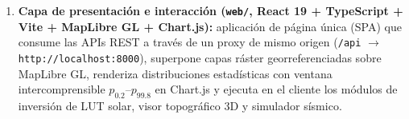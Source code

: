 \documentclass[11pt,a4paper]{article}
\newcommand{\src}[1]{\nolinkurl{#1}}
\begin{document}
\begin{enumerate}
        verificados contra catálogo y las series numéricas de inspección (\texttt{jsonb}) residen en PostGIS
        dentro de un contenedor Docker con volumen persistente (\texttt{pgdata}). Los productos ráster pesados
        (GeoTIFF/COG de $32\,\text{bits}$ y PNG de visualización) se almacenan en jerarquías de disco inmutables
        por hash (, , , 
        y ).
  \item \textbf{Capa de presentación e interacción (\src{web/}, React 19 + TypeScript + Vite + MapLibre GL + Chart.js):}
        aplicación de página única (SPA) que consume las APIs REST a través de un proxy de mismo origen
        (\texttt{/api} $\to$ \texttt{http://localhost:8000}), superpone capas ráster georreferenciadas sobre
        MapLibre GL, renderiza distribuciones estadísticas con ventana intercomprensible $p_{0.2}\text{--}p_{99.8}$
        en Chart.js y ejecuta en el cliente los módulos de inversión de LUT solar, visor topográfico 3D y
        simulador sísmico.
\end{enumerate}
\end{document}
